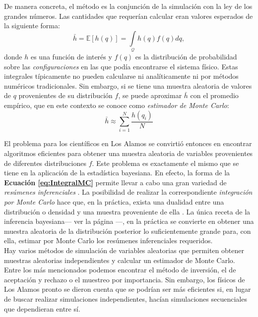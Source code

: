 De manera concreta, el método es la conjunción de la simulación con la ley de los grandes números. Las cantidades que requerían calcular eran valores esperados de la siguiente forma: 
\begin{equation}
\label{eq:IntegralMC}
\bar{h} = \mathbb{E}[h(q)]=\int\limits_\mathcal{Q} h(q)f(q)dq ,
\end{equation} 
donde $h$ es una función de interés y $f(q)$ es la distribución de probabilidad sobre las \textit{configuraciones} en las que podía encontrarse el sistema físico. Estas integrales típicamente no pueden calcularse ni analíticamente ni por métodos numéricos tradicionales. Sin embargo, si se tiene una muestra aleatoria de valores de $q$ provenientes de su distribución $f$, se puede aproximar $\bar{h}$ con el promedio empírico, que en este contexto se conoce como \textit{estimador de Monte Carlo}: 
\begin{equation*}
\bar{h} \approx \sum\limits_{i=1}^N \dfrac{h(q_i)}{N}
\end{equation*}

El problema para los científicos en Los Alamos se convirtió entonces en encontrar algoritmos eficientes para obtener una muestra aleatoria de variables provenientes de diferentes distribuciones $f$. Este problema es exactamente el mismo que se tiene en la aplicación de la estadística bayesiana. En efecto, la forma de la \textbf{Ecuación \ref{eq:IntegralMC}} permite llevar a cabo una gran variedad de \textit{resúmenes inferenciales} \parencite{GP97}. La posibilidad de realizar la correspondiente \textit{integración por Monte Carlo} hace que, en la práctica, exista una dualidad entre una distribución o densidad y una muestra proveniente de ella \parencite{SmithGelfand92}. La única receta de la inferencia bayesiana--- ver la página \pageref{receta_bayesiana}---, en la práctica se convierte en obtener una muestra aleatoria de la distribución posterior lo suficientemente grande para, con ella, estimar por Monte Carlo los resúmenes inferenciales requeridos.\\

Hay varios métodos de simulación de variables aleatorias que permiten obtener muestras aleatorias independientes y calcular un estimador de Monte Carlo. Entre los más mencionados podemos encontrar el método de inversión, el de aceptación y rechazo o el muestreo por importancia. Sin embargo, los físicos de Los Alamos pronto se dieron cuenta que se podrían ser más eficientes si, en lugar de buscar realizar simulaciones independientes, hacían simulaciones secuenciales que dependieran entre sí. 


